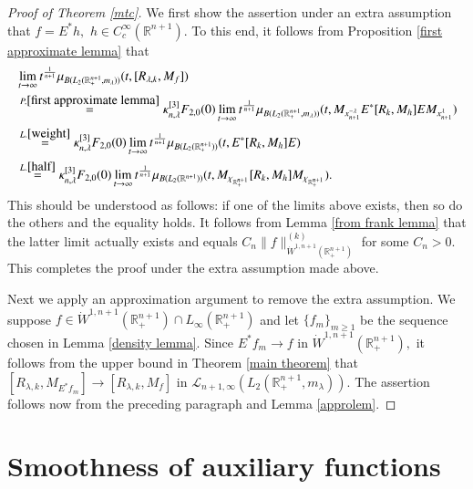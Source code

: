 \documentclass[12pt]{amsart}
\begin{document}
\begin{proof}[Proof of Theorem \ref{mtc}]
We first show the assertion under an extra assumption that $f=E^{\ast}h,$ $h\in C_c^\infty(\mathbb{R}^{n+1}).$ To this end, it follows from Proposition \ref{first approximate lemma} that
\begin{align}\label{spectralasym1}
&\lim_{t\to\infty}t^{\frac1{n+1}}\mu_{B(L_2(\mathbb{R}^{n+1}_+,m_{\lambda}))}(t,[R_{\lambda,k},M_f])\nonumber\\
&\stackrel{P.\ref{first approximate lemma}}{=}\kappa_{n,\lambda}^{[3]}F_{2,0}(0)\lim_{t\to\infty}t^{\frac1{n+1}}\mu_{B(L_2(\mathbb{R}^{n+1}_+,m_{\lambda}))}(t, M_{x_{n+1}^{-\lambda}} E^{\ast}[R_k,M_h]E M_{x_{n+1}^{\lambda}})\nonumber\\
&\stackrel{L.\ref{weight}}{=}\kappa_{n,\lambda}^{[3]}F_{2,0}(0)\lim_{t\to\infty}t^{\frac1{n+1}}\mu_{B(L_2(\mathbb{R}^{n+1}_+))}(t, E^{\ast}[R_k,M_h]E )\nonumber\\
&\stackrel{L.\ref{half}}{=}\kappa_{n,\lambda}^{[3]}F_{2,0}(0)\lim_{t\to\infty}t^{\frac1{n+1}}\mu_{B(L_2(\mathbb{R}^{n+1}))}(t, M_{\chi_{\mathbb{R}^{n+1}_+}}[R_k,M_h]M_{\chi_{\mathbb{R}^{n+1}_+}}).
\end{align}
This should be understood as follows: if one of the limits above exists, then so do the others and the equality holds. It follows from Lemma \ref{from frank lemma} that the latter limit actually exists and equals $C_n\|f\|_{\dot{W}^{1,n+1}(\mathbb{R}_+^{n+1})}^{(k)}$ for some $C_n>0$.  This completes the proof under the extra assumption made above.

Next we apply an approximation argument to remove the extra assumption. We suppose $f\in  \dot{W}^{1,n+1}(\mathbb{R}_+^{n+1})\cap L_{\infty}(\mathbb{R}_+^{n+1})$ and let $\{f_m\}_{m\geq 1}$ be the sequence chosen in Lemma \ref{density lemma}. Since $E^{\ast}f_m\to f$ in $\dot{W}^{1,n+1}(\mathbb{R}^{n+1}_+),$ it follows from the upper bound in Theorem \ref{main theorem} that
$[R_{\lambda,k},M_{E^{\ast}f_m}]\rightarrow [R_{\lambda,k},M_f]$ in $\mathcal{L}_{n+1,\infty}(L_2(\mathbb{R}^{n+1}_+,m_{\lambda})).$ The assertion follows now from the preceding paragraph and Lemma \ref{approlem}.
\end{proof}

\appendix


\section{Smoothness of auxiliary functions}
\setcounter{equation}{0}
\end{document}
